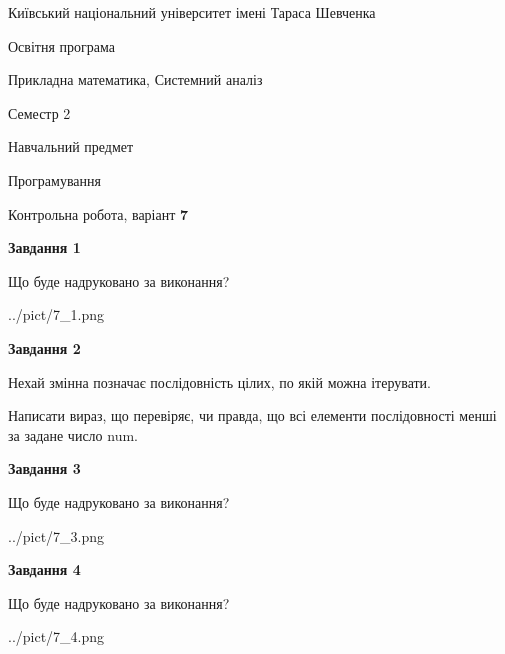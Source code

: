 \documentclass[12pt, ukrainian]{article}
\begin{document}
{{\begin {small}\par
{ \center  Київський національний університет імені Тараса Шевченка \par}
{\parbox {5 cm}{Освітня програма \hfill}{\parbox {8 cm}{Прикладна математика, Системний аналіз \hfill}}\parbox {5 cm}{\hfill Семестр 2}}\par
{\parbox {5 cm} {Навчальний предмет \hfill}\parbox {7 cm}{Програмування \hfill}\parbox {6cm}{\hfill}\par}\vspace{-7pt} \end{small}}{\center Контрольна робота, варіант  \No \textbf
{ 7 }\par}}
{
\begin {large}
{\begin {center}\textbf{Завдання 1}\end {center}}\par
Що буде надруковано за виконання?\par\par
\begin{center}
	{../pict/7_1.png}
\end{center}
\newpage

{\begin {center}\textbf{Завдання 2}\end {center}}\par
Нехай змінна  позначає послідовність цілих, по якій можна ітерувати.

Написати вираз, що перевіряє, чи правда, що всі елементи послідовності менші за задане число num.\par
\newpage

{\begin {center}\textbf{Завдання 3}\end {center}}\par
Що буде надруковано за виконання?\par
\begin{center}
	{../pict/7_3.png}
\end{center}
\newpage

{\begin {center}\textbf{Завдання 4}\end {center}}\par
Що буде надруковано за виконання?\par
\begin{center}
	{../pict/7_4.png}
\end{center}
\newpage


\end{large}}
\end{document}
